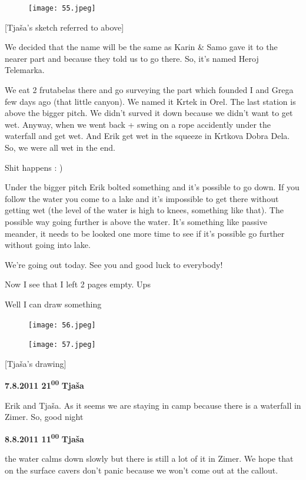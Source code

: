 \begin{figure}[htbp]
\centering
\texttt{[image: 55.jpeg]}
\caption{}
\end{figure}

{[}Tjaša's sketch referred to above{]}

We decided that the name will be the same as Karin \& Samo gave it to
the nearer part and because they told us to go there. So, it's named
Heroj Telemarka.

We eat 2 frutabelas there and go surveying the part which founded I and
Grega few days ago (that little canyon). We named it Krtek in Orel. The
last station is above the bigger pitch. We didn't surved it down because
we didn't want to get wet. Anyway, when we went back + swing on a rope
accidently under the waterfall and get wet. And Erik get wet in the
squeeze in Krtkova Dobra Dela. So, we were all wet in the end.

Shit happens : )

Under the bigger pitch Erik bolted something and it's possible to go
down. If you follow the water you come to a lake and it's impossible to
get there without getting wet (the level of the water is high to knees,
something like that). The possible way going further is above the water.
It's something like passive meander, it needs to be looked one more time
to see if it's possible go further without going into lake.

We're going out today. See you and good luck to everybody!

Now I see that I left 2 pages empty. Ups

Well I can draw something

\begin{figure}[htbp]
\centering
\texttt{[image: 56.jpeg]}
\caption{}
\end{figure}

\begin{figure}[htbp]
\centering
\texttt{[image: 57.jpeg]}
\caption{}
\end{figure}

{[}Tjaša's drawing{]}

\textbf{7.8.2011 21\textsuperscript{00}} \textbf{Tjaša}

Erik and Tjaša. As it seems we are staying in camp because there is a
waterfall in Zimer. So, good night

\textbf{8.8.2011 11\textsuperscript{00}} \textbf{Tjaša}

the water calms down slowly but there is still a lot of it in Zimer. We
hope that on the surface cavers don't panic because we won't come out at
the callout.

